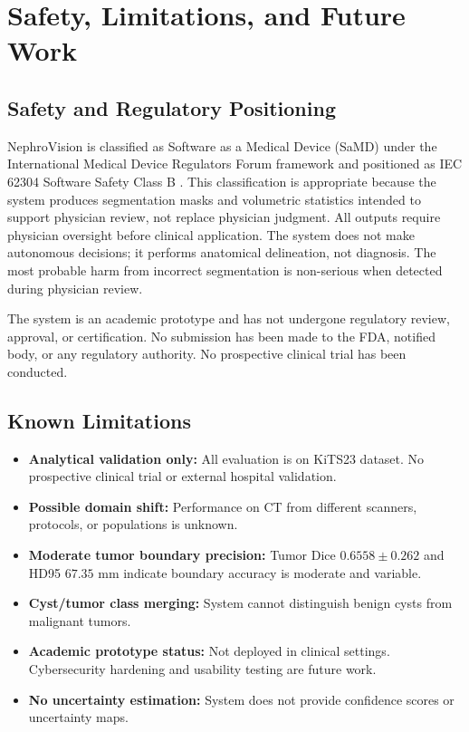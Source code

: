 \section{Safety, Limitations, and Future Work}

\subsection{Safety and Regulatory Positioning}

NephroVision is classified as Software as a Medical Device (SaMD) under the International Medical Device Regulators Forum framework and positioned as IEC 62304 Software Safety Class B \cite{iec62304}. This classification is appropriate because the system produces segmentation masks and volumetric statistics intended to support physician review, not replace physician judgment. All outputs require physician oversight before clinical application. The system does not make autonomous decisions; it performs anatomical delineation, not diagnosis. The most probable harm from incorrect segmentation is non-serious when detected during physician review.

The system is an academic prototype and has not undergone regulatory review, approval, or certification. No submission has been made to the FDA, notified body, or any regulatory authority. No prospective clinical trial has been conducted.

\subsection{Known Limitations}

\begin{itemize}
    \item \textbf{Analytical validation only:} All evaluation is on KiTS23 dataset. No prospective clinical trial or external hospital validation.
    \item \textbf{Possible domain shift:} Performance on CT from different scanners, protocols, or populations is unknown.
    \item \textbf{Moderate tumor boundary precision:} Tumor Dice $0.6558 \pm 0.262$ and HD95 $67.35$ mm indicate boundary accuracy is moderate and variable.
    \item \textbf{Cyst/tumor class merging:} System cannot distinguish benign cysts from malignant tumors.
    \item \textbf{Academic prototype status:} Not deployed in clinical settings. Cybersecurity hardening and usability testing are future work.
    \item \textbf{No uncertainty estimation:} System does not provide confidence scores or uncertainty maps.
\end{itemize}

